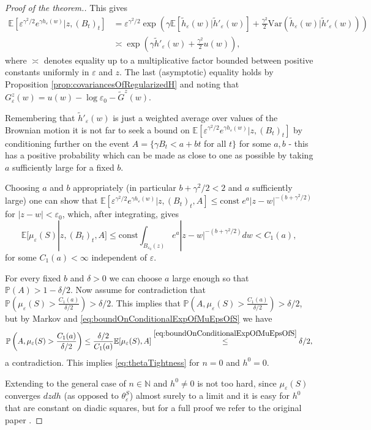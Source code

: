 \documentclass[11pt,reqno]{amsart}
\numberwithin{equation}{section}
\newcommand{\leqby}[1]{\mathrel{\stackrel{#1}{\leq}}}
\newcommand{\eps}{\varepsilon}
\begin{document}
\begin{proof}[Proof of the theorem.]
	This gives\ \begin{align*}
		\mathbb E\left[\eps^{\gamma^2/2}e^{\gamma h_\eps(w)}|z,(B_t)_t\right] &= \eps^{\gamma^2/2}\exp\left(\gamma\mathbb E[\tilde h_\eps(w)|\tilde h'_\eps(w)]+\frac{\gamma^2}{2}\text{Var}(\tilde h_\eps(w)|\tilde h'_\eps(w))\right)\\
		&\asymp\exp\left(\gamma \tilde h'_\eps(w) + \frac{\gamma^2}{2}u(w)\right),
	\end{align*}
	where $\asymp$ denotes equality up to a multiplicative factor bounded between positive constants uniformly in $\eps$ and $z$. The last (asymptotic) equality holds by Proposition \ref{prop:covariancesOfRegularizedH} and noting that $G_\eps^z(w)=u(w)-\log\eps_0-\tilde G^z(w)$.
	
	Remembering that $\tilde h'_\eps(w)$ is just a weighted average over values of the Brownian motion it is not far to seek a bound on $\mathbb E\left[\eps^{\gamma^2/2}e^{\gamma h_\eps(w)}|z,(B_t)_t\right]$ by conditioning further on the event $A=\{\gamma B_t<a+bt$ for all $t\}$ for some $a,b$ - this has a positive probability which can be made as close to one as possible by taking $a$ sufficiently large for a fixed $b$.
	
	Choosing $a$ and $b$ appropriately (in particular $b+\gamma^2/2<2$ and $a$ sufficiently large) one can show that $\mathbb E\left[\eps^{\gamma^2/2}e^{\gamma h_\eps(w)}|z,(B_t)_t,A\right]\leq \text{const} \;e^a|z-w|^{-(b+\gamma^2/2)}$ for $|z-w|<\eps_0$, which, after integrating, gives \begin{equation}\label{eq:boundOnConditionalExpOfMuEpsOfS}
			\mathbb E[\mu_\eps(S)|z,(B_t)_t,A]\leq \text{const}\int_{B_{\eps_0}(z)}e^a|z-w|^{-(b+\gamma^2/2)}dw<C_1(a),
		\end{equation} for some $C_1(a)<\infty$ independent of $\eps$.
	
	For every fixed $b$ and $\delta>0$ we can choose $a$ large enough so that $\mathbb P(A)>1-\delta/2$. Now assume for contradiction that $\mathbb P\left(\mu_\eps(S)>\frac{C_1(a)}{\delta/2}\right)>\delta/2$. This implies that $\mathbb P\left(A,\mu_\eps(S)>\frac{C_1(a)}{\delta/2}\right)>\delta/2$, but by Markov and \eqref{eq:boundOnConditionalExpOfMuEpsOfS} we have $$\mathbb P\left(A,\mu_\eps(S)>\frac{C_1(a)}{\delta/2}\right)\leq \frac{\delta/2}{C_1(a)} \mathbb E[\mu_\eps(S),A]\leqby{\eqref{eq:boundOnConditionalExpOfMuEpsOfS}} \delta/2,$$ a contradiction. This implies \eqref{eq:thetaTightness} for $n=0$ and $h^0=0$.
	
	Extending to the general case of $n\in\mathbb N$ and $h^0\neq 0$ is not too hard, since $\mu_\eps(S)$ converges $dzdh$ (as opposed to $\theta_\eps^S$) almost surely to a limit and it is easy for $h^0$ that are constant on diadic squares, but for a full proof we refer to the original paper \cite{Dup10}.
	\end{proof}
\end{document}
